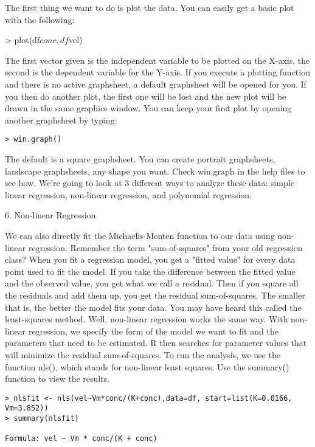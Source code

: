 {The first thing we want to do is plot the data. You can easily get a basic plot with the following:

> plot(df$conc, df$vel)

The first vector given is the independent variable to be plotted on the X-axis, the second is the dependent variable for the Y-axis. If you execute a plotting function and there is no active graphsheet, a default graphsheet will be opened for you. If you then do another plot, the first one will be lost and the new plot will be drawn in the 
same graphics window. You can keep your first plot by opening another graphsheet by typing: 

\begin{verbatim}
> win.graph()
\end{verbatim}
The default is a square graphsheet. You can create portrait graphsheets, landscape graphsheets, any shape you want. Check win.graph in the help files to see how. 
We're going to look at 3 different ways to analyze these data: simple linear regression, non-linear regression, and polynomial regression. 


6. Non-linear Regression


We can also directly fit the Michaelis-Menten function to our data using non-linear regression. Remember the term "sum-of-squares" from your old regression class? When you fit a regression model, you get a "fitted value" for every data point used to fit the model. If you take the difference between the fitted value and the observed value, you get what we call a residual. Then if you square all the residuals and add them up, you get the residual sum-of-squares. The smaller that is, the better the model fits your data. You may have heard this called the least-squares method. Well, non-linear regression works the same way. With non-linear regression, we specify the form of the model we want to fit and the parameters that need to be estimated. R then searches for parameter values that will minimize the residual sum-of-squares. 
To run the analysis, we use the function nls(), which stands for non-linear least squares. Use the summary() function to view the results. 
\begin{framed}
\begin{verbatim}
> nlsfit <- nls(vel~Vm*conc/(K+conc),data=df, start=list(K=0.0166, Vm=3.852))
> summary(nlsfit)

Formula: vel ~ Vm * conc/(K + conc)


\end{verbatim}
\end{framed}}
